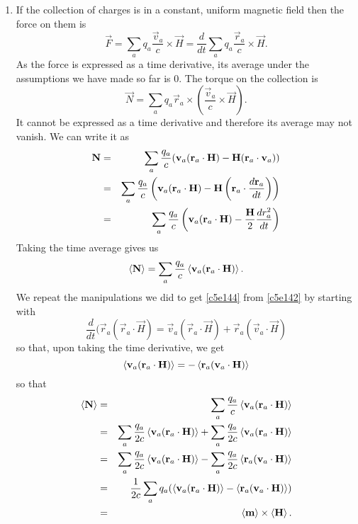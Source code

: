 \begin{enumerate}
\item If the collection of charges is in a constant, uniform magnetic field then
the force on them is
\[
\vec{F} = \sum_a q_a\frac{\vec{v}_a}{c}\times\vec{H} = 
\frac{d}{dt}\sum_a q_a\frac{\vec{r}_a}{c}\times\vec{H}.
\]
As the force is expressed as a time derivative, its average under the assumptions
we have made so far is $0$. The torque on the collection is
\begin{equation}\label{c5e150}
\vec{N} = \sum_a q_a\vec{r}_a \times \left(\frac{\vec{v}_a}{c}\times\vec{H}\right).
\end{equation}
It cannot be expressed as a time derivative and therefore its average may not
vanish. We can write it as
\begin{eqnarray*}
\mathbf{N} &=& \sum_a\frac{q_a}{c}(\mathbf{v}_a(\mathbf{r}_a\cdot\mathbf{H}) - \mathbf{H}(\mathbf{r}_a\cdot\mathbf{v}_a)) \\
 &=& \sum_a\frac{q_a}{c}\left(\mathbf{v}_a(\mathbf{r}_a\cdot\mathbf{H}) - \mathbf{H}\left(\mathbf{r}_a\cdot\frac{d{\mathbf{r}_a}}{d{t}}\right)\right) \\
  &=& \sum_a\frac{q_a}{c}\left(\mathbf{v}_a(\mathbf{r}_a\cdot\mathbf{H}) - \frac{\mathbf{H}}{2}\frac{d{r_a^2}}{d{t}}\right)
\end{eqnarray*}
Taking the time average gives us
\begin{equation}\label{c5e151}
\left\langle{\mathbf{N}}\right\rangle = \sum_a\frac{q_a}{c}\left\langle{\mathbf{v}_a(\mathbf{r}_a\cdot\mathbf{H})}\right\rangle.
\end{equation}
We repeat the manipulations we did to get \eqref{c5e144} from \eqref{c5e142} by 
starting with
\[
\frac{d}{dt}(\vec{r}_a(\vec{r}_a\cdot\vec{H}) = \vec{v}_a(\vec{r}_a\cdot\vec{H}) + \vec{r}_a(\vec{v}_a\cdot\vec{H})
\]
so that, upon taking the time derivative, we get
\begin{equation}\label{c5e152}
\left\langle{\mathbf{v}_a(\mathbf{r}_a\cdot\mathbf{H})}\right\rangle = -\left\langle{\mathbf{r}_a(\mathbf{v}_a\cdot\mathbf{H})}\right\rangle
\end{equation}
so that
\begin{eqnarray}
\left\langle{\mathbf{N}}\right\rangle &=& \sum_a\frac{q_a}{c}\left\langle{\mathbf{v}_a(\mathbf{r}_a\cdot\mathbf{H})}\right\rangle \nonumber \\
 &=& \sum_a\frac{q_a}{2c}\left\langle{\mathbf{v}_a(\mathbf{r}_a\cdot\mathbf{H})}\right\rangle + 
 \sum_a\frac{q_a}{2c}\left\langle{\mathbf{v}_a(\mathbf{r}_a\cdot\mathbf{H})}\right\rangle \nonumber \\
 &=& \sum_a\frac{q_a}{2c}\left\langle{\mathbf{v}_a(\mathbf{r}_a\cdot\mathbf{H})}\right\rangle - 
 \sum_a\frac{q_a}{2c}\left\langle{\mathbf{r}_a(\mathbf{v}_a\cdot\mathbf{H})}\right\rangle \nonumber \\
 &=& \frac{1}{2c}\sum_a q_a(\left\langle{\mathbf{v}_a(\mathbf{r}_a\cdot\mathbf{H})}\right\rangle - \left\langle{\mathbf{r}_a(\mathbf{v}_a\cdot\mathbf{H})}\right\rangle) 
 \nonumber \\
 &=& \left\langle{\mathbf{m}}\right\rangle \times \left\langle{\mathbf{H}}\right\rangle. \label{c5e153}
\end{eqnarray}


\end{enumerate}
